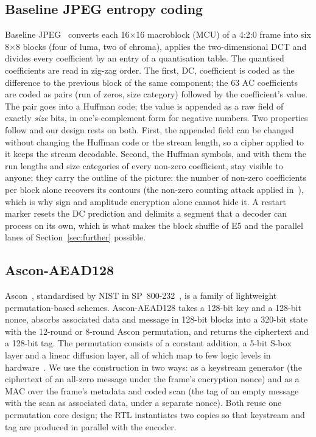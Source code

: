 \documentclass{ieeeaccess}
\begin{document}
\subsection{Baseline JPEG entropy coding}
Baseline JPEG~\cite{t81,wallace1992} converts each 16$\times$16 macroblock (MCU) of a 4:2:0 frame into six 8$\times$8 blocks (four of luma, two of chroma), applies the two-dimensional DCT and divides every coefficient by an entry of a quantisation table. The quantised coefficients are read in zig-zag order. The first, DC, coefficient is coded as the difference to the previous block of the same component; the 63 AC coefficients are coded as pairs (run of zeros, size category) followed by the coefficient's value. The pair goes into a Huffman code; the value is appended as a raw field of exactly \emph{size} bits, in one's-complement form for negative numbers. Two properties follow and our design rests on both. First, the appended field can be changed without changing the Huffman code or the stream length, so a cipher applied to it keeps the stream decodable. Second, the Huffman symbols, and with them the run lengths and size categories of every non-zero coefficient, stay visible to anyone; they carry the outline of the picture: the number of non-zero coefficients per block alone recovers its contours (the non-zero counting attack applied in~\cite{hirose2024}), which is why sign and amplitude encryption alone cannot hide it. A restart marker resets the DC prediction and delimits a segment that a decoder can process on its own, which is what makes the block shuffle of E5 and the parallel lanes of Section~\ref{sec:further} possible.

\subsection{Ascon-AEAD128}
Ascon~\cite{ascon}, standardised by NIST in SP~800-232~\cite{sp800232}, is a family of lightweight permutation-based schemes. Ascon-AEAD128 takes a 128-bit key and a 128-bit nonce, absorbs associated data and message in 128-bit blocks into a 320-bit state with the 12-round or 8-round Ascon permutation, and returns the ciphertext and a 128-bit tag. The permutation consists of a constant addition, a 5-bit S-box layer and a linear diffusion layer, all of which map to few logic levels in hardware~\cite{gross2017}. We use the construction in two ways: as a keystream generator (the ciphertext of an all-zero message under the frame's encryption nonce) and as a MAC over the frame's metadata and coded scan (the tag of an empty message with the scan as associated data, under a separate nonce). Both reuse one permutation core design; the RTL instantiates two copies so that keystream and tag are produced in parallel with the encoder.
\fi
\end{document}
